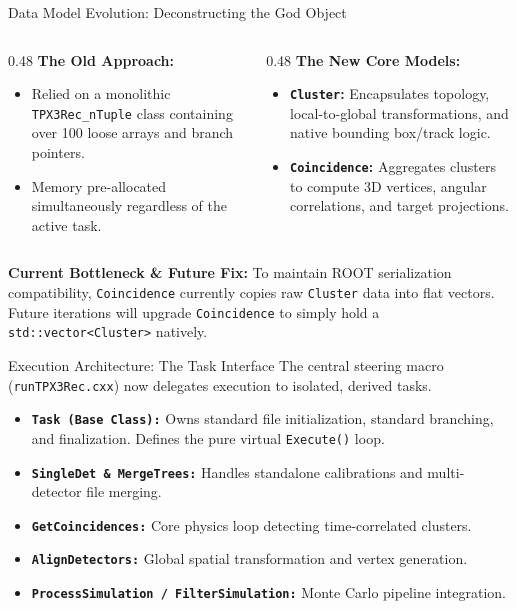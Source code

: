 \documentclass[aspectratio=169]{beamer}
\begin{document}
	\begin{frame}{Data Model Evolution: Deconstructing the God Object}
		\begin{columns}[T]
			\begin{column}{0.48\textwidth}
				\textbf{The Old Approach:}
				\begin{itemize}
					\item Relied on a monolithic \texttt{TPX3Rec\_nTuple} class containing over 100 loose arrays and branch pointers.
					\item Memory pre-allocated simultaneously regardless of the active task.
				\end{itemize}
			\end{column}
			\begin{column}{0.48\textwidth}
				\textbf{The New Core Models:}
				\begin{itemize}
					\item \textbf{\texttt{Cluster}:} Encapsulates topology, local-to-global transformations, and native bounding box/track logic.
					\item \textbf{\texttt{Coincidence}:} Aggregates clusters to compute 3D vertices, angular correlations, and target projections.
				\end{itemize}
			\end{column}
		\end{columns}
		
		\vspace{0.5cm}
		\textbf{Current Bottleneck \& Future Fix:} 
		To maintain ROOT serialization compatibility, \texttt{Coincidence} currently copies raw \texttt{Cluster} data into flat vectors. Future iterations will upgrade \texttt{Coincidence} to simply hold a \texttt{std::vector<Cluster>} natively.
	\end{frame}
	
	\begin{frame}{Execution Architecture: The Task Interface}
		The central steering macro (\texttt{runTPX3Rec.cxx}) now delegates execution to isolated, derived tasks.
		
		\vspace{0.3cm}
		\begin{itemize}
			\item \textbf{\texttt{Task (Base Class):}} Owns standard file initialization, standard branching, and finalization. Defines the pure virtual \texttt{Execute()} loop.
			\item \textbf{\texttt{SingleDet \& MergeTrees:}} Handles standalone calibrations and multi-detector file merging.
			\item \textbf{\texttt{GetCoincidences:}} Core physics loop detecting time-correlated clusters.
			\item \textbf{\texttt{AlignDetectors:}} Global spatial transformation and vertex generation.
			\item \textbf{\texttt{ProcessSimulation / FilterSimulation:}} Monte Carlo pipeline integration.
		\end{itemize}
	\end{frame}
	
\end{document}
